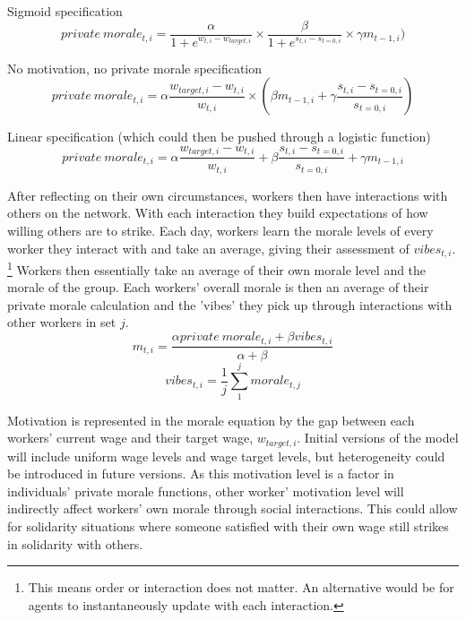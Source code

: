 \documentclass[a4paper]{article}
\begin{document}
Sigmoid specification
\begin{equation}
    private~morale_{t,i} = \frac{\alpha}{1+e^{w_{t,i}-w_{target,i}}}\times\frac{\beta}{1+e^{s_{t,i}-s_{t=0,i}}}\times\gamma m_{t-1,i})
\end{equation}

No motivation, no private morale specification
\begin{equation}
    private~morale_{t,i} = \alpha\frac{w_{target,i}-w_{t,i}}{w_{t,i}}\times(\beta m_{t-1,i}+\gamma\frac{s_{t,i}-s_{t=0,i}}{s_{t=0,i}})
\end{equation}

Linear specification (which could then be pushed through a logistic function)
\begin{equation}
    private~morale_{t,i} = \alpha\frac{w_{target,i}-w_{t,i}}{w_{t,i}}+\beta\frac{s_{t,i}-s_{t=0,i}}{s_{t=0,i}}+\gamma m_{t-1,i}
\end{equation}

After reflecting on their own circumstances, workers then have interactions with others on the network. With each interaction they build expectations of how willing others are to strike. Each day, workers learn the morale levels of every worker they interact with and take an average, giving their assessment of $vibes_{t,i}$. \footnote{This means order or interaction does not matter. An alternative would be for agents to instantaneously update with each interaction.} Workers then essentially take an average of their own morale level and the morale of the group. 
Each workers' overall morale is then an average of their private morale calculation and the 'vibes' they pick up through interactions with other workers in set $j$.
\begin{equation}
    m_{t,i} = \frac{\alpha private~morale_{t,i} + \beta vibes_{t,i}}{\alpha+\beta}
\end{equation}
\begin{equation} 
vibes_{t,i}=\frac{1}{j}\sum_{1}^{j}morale_{t,j}
\end{equation}

Motivation is represented in the morale equation by the gap between each workers' current wage and their target wage, $w_{target,i}$. Initial versions of the model will include uniform wage levels and wage target levels, but heterogeneity could be introduced in future versions. As this motivation level is a factor in individuals' private morale functions, other worker' motivation level will indirectly affect workers' own morale through social interactions. This could allow for solidarity situations where someone satisfied with their own wage still strikes in solidarity with others.
\end{document}
